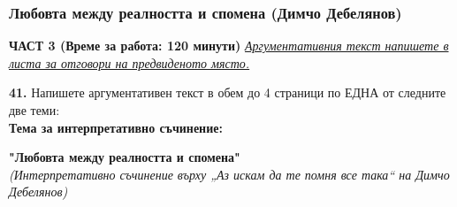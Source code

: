 \documentclass[12pt,a4paper]{article}
\begin{document}
\subsubsection{Любовта между реалността и спомена (Димчо Дебелянов)}
\vspace{0.5cm}
\begin{center}
\textbf{ЧАСТ 3 (Време за работа: 120 минути)}
\vspace{0.2cm}
{\textit{\underline{Аргументативния текст напишете в листа за отговори на предвиденото място.}}}
\vspace{0.1cm}
\end{center}
\textbf{41.} Напишете аргументативен текст в обем до 4 страници по ЕДНА от следните две теми:
\\
\vspace{0.2cm}
\textbf{Тема за интерпретативно съчинение:}
\vspace{0.1cm}
\begin{center}
\textbf{"Любовта между реалността и спомена"}
\\
\textit{(Интерпретативно съчинение върху „Аз искам да те помня все така“ на Димчо Дебелянов)}
\end{center}
\end{document}
